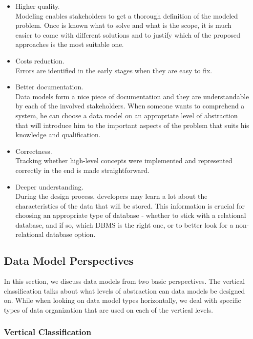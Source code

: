 \begin{itemize}
	\item Higher quality.\\ Modeling enables stakeholders to get a thorough definition of the modeled problem. Once is known what to solve and what is the scope, it is much easier to come with different solutions and to justify which of the proposed approaches is the most suitable one.
	
	\item Costs reduction.\\ Errors are identified in the early stages when they are easy to fix.
	
	\item Better documentation.\\ Data models form a nice piece of documentation and they are understandable by each of the involved stakeholders. When someone wants to comprehend a system, he can choose a data model on an appropriate level of abstraction that will introduce him to the important aspects of the problem that suits his knowledge and qualification.
	
	\item Correctness.\\ Tracking whether high-level concepts were implemented and represented correctly in the end is made straightforward.
	
	\item Deeper understanding.\\ During the design process, developers may learn a lot about the characteristics of the data that will be stored. This information is crucial for choosing an appropriate type of database - whether to stick with a relational database, and if so, which DBMS is the right one, or to better look for a non-relational database option.
\end{itemize}

\subsection{Data Model Perspectives}

In this section, we discuss data models from two basic perspectives. 
The vertical classification talks about what levels of abstraction can data models be designed on.
While when looking on data model types horizontally, we deal with specific types of data organization that are used on each of the vertical levels.

\subsubsection{Vertical Classification}

